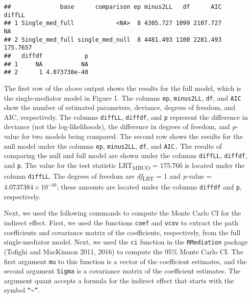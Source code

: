 \documentclass[11pt,]{article}
\begin{document}
\begin{verbatim}
##              base      comparison ep minus2LL   df      AIC   diffLL
## 1 Single_med_full            <NA>  8 4305.727 1099 2107.727       NA
## 2 Single_med_full single_med_null  8 4481.493 1100 2281.493 175.7657
##   diffdf            p
## 1     NA           NA
## 2      1 4.073738e-40
\end{verbatim}

The first row of the above output shows the results for the full model,
which is the single-mediator model in Figure 1. The columns \texttt{ep},
\texttt{minus2LL}, \texttt{df}, and \texttt{AIC} show the number of
estimated parameters, deviance, degrees of freedom, and AIC,
respectively. The columns \texttt{diffLL}, \texttt{diffdf}, and
\texttt{p} represent the difference in deviance (not the
log-likelihoods), the difference in degrees of freedom, and
\emph{p}-value for two models being compared. The second row shows the
results for the null model under the columns \texttt{ep},
\texttt{minus2LL}, \texttt{df}, and \texttt{AIC.} The results of
comparing the null and full model are shown under the columns
\texttt{diffLL}, \texttt{diffdf}, and \texttt{p}. The value for the test
statistic LRT\textsubscript{MBCO} = 175.766 is located under the column
\texttt{diffLL}. The degrees of freedom are \emph{df}\textsubscript{LRT}
= 1 and \emph{p}-value = \ensuremath{4.0737384\times 10^{-40}}; these
amounts are located under the columns \texttt{diffdf} and \texttt{p},
respectively.

Next, we used the following commands to compute the Monte Carlo CI for
the indirect effect. First, we used the functions \texttt{coef} and
\texttt{vcov} to extract the path coefficients and covariance matrix of
the coefficients, respectively, from the full single-mediator model.
Next, we used the \texttt{ci} function in the \texttt{RMediation}
package (Tofighi and MacKinnon 2011, 2016) to compute the 95\% Monte
Carlo CI. The first argument \texttt{mu} to this function is a vector of
the coefficient estimates, and the second argument \texttt{Sigma} is a
covariance matrix of the coefficient estimates. The argument quant
accepts a formula for the indirect effect that starts with the symbol
\texttt{“\textasciitilde{}”}.
\end{document}
